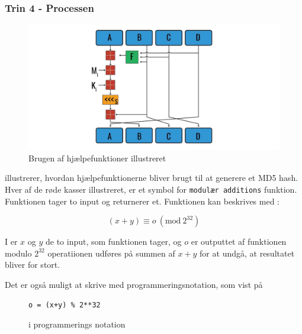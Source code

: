 \documentclass[12pt]{article}
\newcommand{\Mod}[1]{\ (\mathrm{mod}\ #1)}
\begin{document}
\subsubsection{Trin 4 - Processen}
\begin{figure}[h]
\includegraphics[width=1\linewidth]{hashing-round.jpg} 
\centering
\caption{Brugen af hjælpefunktioner illustreret \cite{lake_md5_2021}}
\label{fig:aux-func-used}
\end{figure}

\figureautorefname{~\ref{fig:aux-func-used}} illustrerer, hvordan hjælpefunktionerne bliver brugt til at generere et MD5 hash. Hver af de røde kasser illustreret, er et symbol for \verb|modulær additions| funktion. Funktionen tager to input og returnerer et. Funktionen kan beskrives med \equationautorefname{~\ref{step-4-func}}:

\begin{equation}\label{step-4-func}
(x+y) \equiv o \Mod{2^{32}}
\end{equation}

I \equationautorefname{~\ref{step-4-func}} er $x$ og $y$ de to input, som funktionen tager, og $o$ er outputtet af funktionen modulo $2^{32}$ operatiionen udføres på summen af $x+y$ for at undgå, at resultatet bliver for stort. 

Det er også muligt at skrive \equationautorefname{~\ref{step-4-func}} med programmeringsnotation, som vist på \figureautorefname{~\ref{code:step-4-mod_add}}

\begin{figure}[!ht]
\begin{verbatim}
o = (x+y) % 2**32
\end{verbatim}
\caption{\equationautorefname{~\ref{step-4-func}} i programmerings notation}
\label{code:step-4-mod_add}
\end{figure}
\end{document}
